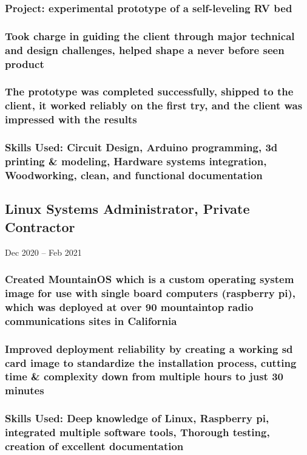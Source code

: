 \documentclass{article}
\begin{document}
    	\subsubsection{Project: experimental prototype of a self-leveling RV bed}
        \subsubsection{Took charge in guiding the client through major technical and design challenges, helped shape a never before seen product}
        \subsubsection{The prototype was completed successfully, shipped to the client, it worked reliably on the first try, and the client was impressed with the results} 
    	\subsubsection{Skills Used: Circuit Design, Arduino programming, 3d printing & modeling, Hardware systems integration, Woodworking, clean, and functional documentation}
    	
    \subsection{Linux Systems Administrator, Private Contractor} Dec 2020 – Feb 2021
        
        \vspace{-2mm}
    	\subsubsection{Created MountainOS which is a custom operating system image for use with single board computers (raspberry pi), which was deployed at over 90 mountaintop radio communications sites in California}
    	\subsubsection{Improved deployment reliability by creating a working sd card image to standardize the installation process, cutting time & complexity down from multiple hours to just 30 minutes}
    	\subsubsection{Skills Used: Deep knowledge of Linux, Raspberry pi, integrated multiple software tools, Thorough testing, creation of excellent documentation}
	 
\end{document}
